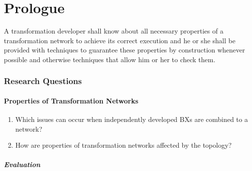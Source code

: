 \part{Prologue}


\begin{researchgoal}
	A transformation developer shall know about all necessary properties of a transformation network to achieve its correct execution and he or she shall be provided with techniques to guarantee these properties by construction whenever possible and otherwise techniques that allow him or her to check them.
\end{researchgoal}

\section{Research Questions}

\subsection*{Properties of Transformation Networks}
\begin{enumerate}[label=\itshape RQ \arabic*.]
	\item Which issues can occur when independently developed \acp{BX} are combined to a network?
	\item How are properties of transformation networks affected by the topology?
\end{enumerate}

\subsubsection*{Evaluation}

